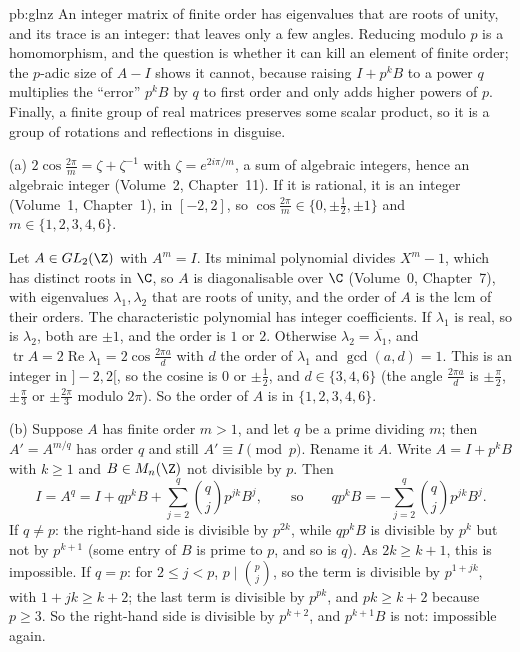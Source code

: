 \begin{solution}{pb:glnz}
\idea An integer matrix of finite order has eigenvalues that are roots of unity, and its trace is an integer: that leaves only
a few angles. Reducing modulo $p$ is a homomorphism, and the question is whether it can kill an element of finite order; the
$p$-adic size of $A-I$ shows it cannot, because raising $I+p^kB$ to a power $q$ multiplies the ``error'' $p^kB$ by $q$ to
first order and only adds higher powers of $p$. Finally, a finite group of real matrices preserves some scalar product,
so it is a group of rotations and reflections in disguise.

\writeup (a) $2\cos\frac{2\pi}m=\zeta+\zeta^{-1}$ with $\zeta=e^{2i\pi/m}$, a sum of algebraic integers, hence an algebraic
integer (Volume~2, Chapter~11). If it is rational, it is an integer (Volume~1, Chapter~1), in $[-2,2]$, so $\cos\frac{2\pi}m\in
\{0,\pm\frac12,\pm1\}$ and $m\in\{1,2,3,4,6\}$.

Let $A\in GL_2(\Z)$ with $A^m=I$. Its minimal polynomial divides $X^m-1$, which has distinct roots in $\C$, so $A$ is
diagonalisable over $\C$ (Volume~0, Chapter~7), with eigenvalues $\lambda_1,\lambda_2$ that are roots of unity, and the order of
$A$ is the lcm of their orders. The characteristic polynomial has integer coefficients. If $\lambda_1$ is real, so is
$\lambda_2$, both are $\pm1$, and the order is $1$ or $2$. Otherwise $\lambda_2=\overline{\lambda_1}$, and
$\operatorname{tr}A=2\operatorname{Re}\lambda_1=2\cos\frac{2\pi a}{d}$ with $d$ the order of $\lambda_1$ and $\gcd(a,d)=1$.
This is an integer in $]-2,2[$, so the cosine is $0$ or $\pm\frac12$, and $d\in\{3,4,6\}$ (the angle $\frac{2\pi a}d$ is
$\pm\frac\pi2$, $\pm\frac\pi3$ or $\pm\frac{2\pi}3$ modulo $2\pi$). So the order of $A$ is in $\{1,2,3,4,6\}$.

(b) Suppose $A$ has finite order $m>1$, and let $q$ be a prime dividing $m$; then $A'=A^{m/q}$ has order $q$ and still
$A'\equiv I\pmod p$. Rename it $A$. Write $A=I+p^kB$ with $k\ge1$ and $B\in M_n(\Z)$ not divisible by $p$. Then
\[
I=A^q=I+qp^kB+\sum_{j=2}^q\binom qjp^{jk}B^j,\qquad\text{so}\qquad qp^kB=-\sum_{j=2}^q\binom qjp^{jk}B^j.
\]
If $q\ne p$: the right-hand side is divisible by $p^{2k}$, while $qp^kB$ is divisible by $p^k$ but not by $p^{k+1}$ (some
entry of $B$ is prime to $p$, and so is $q$). As $2k\ge k+1$, this is impossible. If $q=p$: for $2\le j<p$, $p\mid\binom pj$, so
the term is divisible by $p^{1+jk}$, with $1+jk\ge k+2$; the last term is divisible by $p^{pk}$, and $pk\ge k+2$ because
$p\ge3$. So the right-hand side is divisible by $p^{k+2}$, and $p^{k+1}B$ is not: impossible again.


\end{solution}
